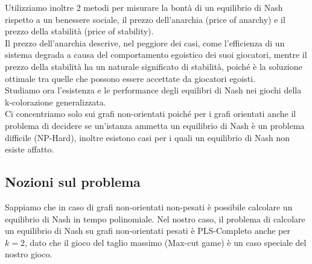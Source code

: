 Utilizziamo inoltre 2 metodi per misurare la bontà di un equilibrio di Nash rispetto a un benessere sociale, il prezzo dell'anarchia (price of anarchy) e il prezzo della stabilità (price of stability).\\
Il prezzo dell'anarchia descrive, nel peggiore dei casi, come l'efficienza di un sistema degrada a causa del comportamento egoistico dei suoi giocatori, mentre il prezzo della stabilità ha un naturale significato di stabilità, poiché è la soluzione ottimale tra quelle che possono essere accettate da giocatori egoisti.\\
Studiamo ora l'esistenza e le performance degli equilibri di Nash nei giochi della k-colorazione generalizzata.\\
Ci concentriamo solo sui grafi non-orientati poiché per i grafi orientati anche il problema di decidere se un'istanza ammetta un equilibrio di Nash è un problema difficile (NP-Hard), inoltre esistono casi per i quali un equilibrio di Nash non esiste affatto.

\subsection{Nozioni sul problema}
\justify
Sappiamo che in caso di grafi non-orientati non-pesati è possibile calcolare un equilibrio di Nash in tempo polinomiale.
Nel nostro caso, il problema di calcolare un equilibrio di Nash su grafi non-orientati pesati è PLS-Completo anche per \(k = 2\), dato che il gioco del taglio massimo (Max-cut game) è un caso speciale del nostro gioco.

